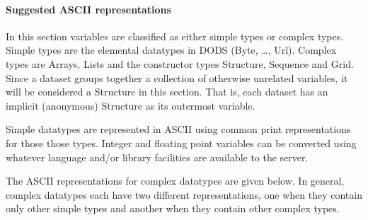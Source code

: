 \documentclass{article}
\begin{document}
\paragraph{Suggested ASCII representations}

In this section variables are classified as either simple types or complex
types. Simple types are the elemental datatypes in DODS (Byte, \ldots, Url).
Complex types are Arrays, Lists and the constructor types Structure, Sequence
and Grid. Since a dataset groups together a collection of otherwise unrelated
variables, it will be considered a Structure in this section. That is, each
dataset has an implicit (anonymous) Structure as its outermost variable.

Simple datatypes are represented in ASCII using common print representations
for those those types. Integer and floating point variables can be converted
using whatever language and/or library facilities are available to the
server.

The ASCII representations for complex datatypes are given below. In general,
complex datatypes each have two different representations, one when they
contain only other simple types and another when they contain other complex
types. 
\end{document}
